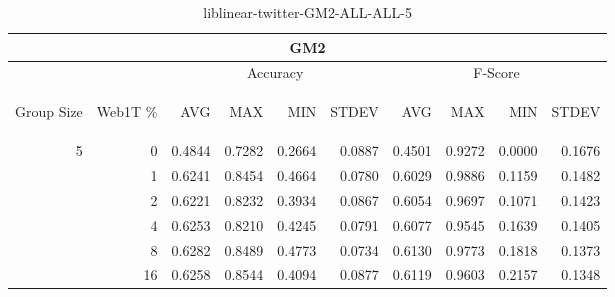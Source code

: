 \begin{center}
\begin{table}[htbp]
\begin{tabular}{ | r | r | r | r | r | r | r | r | r | r |}
\hline
\multicolumn{10}{|c|}{GM2}\\
\hline
 & & \multicolumn{4}{|c|}{Accuracy} & \multicolumn{4}{|c|}{F-Score}\\ \cline{3-10}
\begin{sideways}Group Size\end{sideways} & \begin{sideways}Web1T \%\end{sideways} & \begin{sideways}AVG\end{sideways} & \begin{sideways}MAX\end{sideways} & \begin{sideways}MIN\end{sideways} & \begin{sideways}STDEV\end{sideways} & \begin{sideways}AVG\end{sideways} & \begin{sideways}MAX\end{sideways} & \begin{sideways}MIN\end{sideways} & \begin{sideways}STDEV\end{sideways}\\
\hline
\multirow{5}{*}{5}
 & 0 & 0.4844 & 0.7282 & 0.2664 & 0.0887 & 0.4501 & 0.9272 & 0.0000 & 0.1676\\ \cline{2-10}
 & 1 & 0.6241 & 0.8454 & 0.4664 & 0.0780 & 0.6029 & 0.9886 & 0.1159 & 0.1482\\ \cline{2-10}
 & 2 & 0.6221 & 0.8232 & 0.3934 & 0.0867 & 0.6054 & 0.9697 & 0.1071 & 0.1423\\ \cline{2-10}
 & 4 & 0.6253 & 0.8210 & 0.4245 & 0.0791 & 0.6077 & 0.9545 & 0.1639 & 0.1405\\ \cline{2-10}
 & 8 & 0.6282 & 0.8489 & 0.4773 & 0.0734 & 0.6130 & 0.9773 & 0.1818 & 0.1373\\ \cline{2-10}
 & 16 & 0.6258 & 0.8544 & 0.4094 & 0.0877 & 0.6119 & 0.9603 & 0.2157 & 0.1348\\ \cline{2-10}
\hline
\end{tabular}
\caption{liblinear-twitter-GM2-ALL-ALL-5}
\label{table:liblinear-twitter-GM2-ALL-ALL-5}
\end{table}
\end{center}

